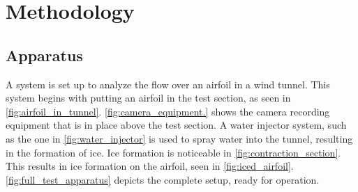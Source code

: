 \chapter{Methodology}
\label{cp:methodology}
\section{Apparatus} \label{sec:apparatus}

A system is set up to analyze the flow over an airfoil in a wind tunnel. This system begins with putting an airfoil in the test section, as seen in \autoref{fig:airfoil_in_tunnel}. \autoref{fig:camera_equipment.} shows the camera recording equipment that is in place above the test section. A water injector system, such as the one in \autoref{fig:water_injector} is used to spray water into the tunnel, resulting in the formation of ice. Ice formation is noticeable in \autoref{fig:contraction_section}. This results in ice formation on the airfoil, seen in \autoref{fig:iced_airfoil}. \autoref{fig:full_test_apparatus} depicts the complete setup, ready for operation.

